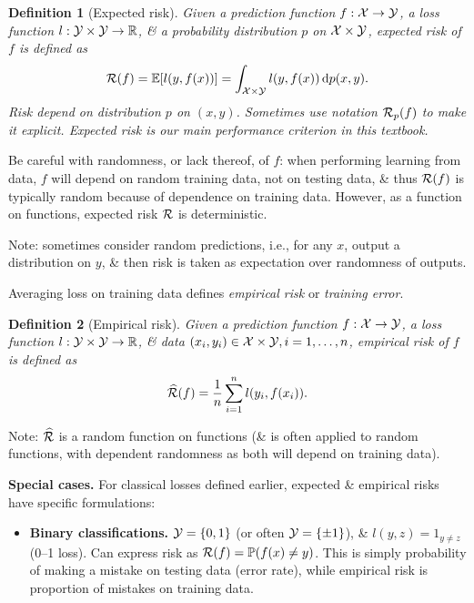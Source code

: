 \documentclass{article}
\newtheorem{definition}{Definition}
\begin{document}
\begin{enumerate}
\begin{itemize}
\begin{itemize}
\begin{itemize}
				\begin{definition}[Expected risk]
					Given a prediction function $f:{\cal X}\to{\cal Y}$, a loss function $l:{\cal Y}\times{\cal Y}\to\mathbb{R}$, \& a probability distribution $p$ on ${\cal X}\times{\cal Y}$, {\rm expected risk} of $f$ is defined as
					\begin{equation}
						{\cal R}(f) = \mathbb{E}[l(y,f(x))] = \int_{{\cal X}\times{\cal Y}} l(y,f(x))\,{\rm d}p(x,y).
					\end{equation}
					Risk depend on distribution $p$ on $(x,y)$. Sometimes use notation ${\cal R}_p(f)$ to make it explicit. Expected risk is our main performance criterion in this textbook.
				\end{definition}
				Be careful with randomness, or lack thereof, of $f$: when performing learning from data, $f$ will depend on random training data, not on testing data, \& thus ${\cal R}(f)$ is typically random because of dependence on training data. However, as a function on functions, expected risk ${\cal R}$ is deterministic.
				
				Note: sometimes consider random predictions, i.e., for any $x$, output a distribution on $y$, \& then risk is taken as expectation over randomness of outputs.
				
				Averaging loss on training data defines {\it empirical risk} or {\it training error}.
				
				\begin{definition}[Empirical risk]
					Given a prediction function $f:{\cal X}\to{\cal Y}$, a loss function $l:{\cal Y}\times{\cal Y}\to\mathbb{R}$, \& data $(x_i,y_i)\in{\cal X}\times{\cal Y},i = 1,\ldots,n$, {\rm empirical risk} of $f$ is defined as
					\begin{equation}
						\widehat{\cal R}(f) = \frac{1}{n}\sum_{i=1}^n l(y_i,f(x_i)).
					\end{equation}
				\end{definition}
				Note: $\widehat{\cal R}$ is a random function on functions (\& is often applied to random functions, with dependent randomness as both will depend on training data).
				
				{\bf Special cases.} For classical losses defined earlier, expected \& empirical risks have specific formulations:
				\begin{itemize}
					\item {\bf Binary classifications.} ${\cal Y} = \{0,1\}$ (or often ${\cal Y} = \{\pm1\}$), \& $l(y,z) = 1_{y\ne z}$ (0--1 loss). Can express risk as ${\cal R}(f) = \mathbb{P}(f(x)\ne y)$. This is simply probability of making a mistake on testing data (error rate), while empirical risk is proportion of mistakes on training data.
					

\end{itemize}
\end{itemize}
\end{itemize}
\end{itemize}
\end{enumerate}
\end{document}
